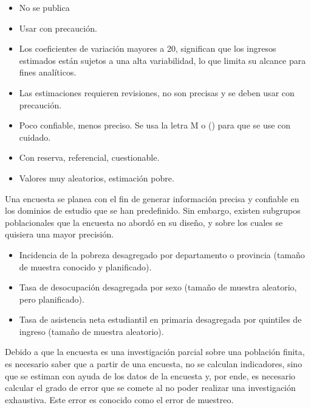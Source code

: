 \documentclass[12pt,spanish,]{book}
\providecommand{\tightlist}{%
  \setlength{\itemsep}{0pt}\setlength{\parskip}{0pt}}
\begin{document}
\begin{itemize}
\tightlist
\item
  No se publica
\item
  Usar con precaución.
\item
  Los coeficientes de variación mayores a 20, significan que los ingresos estimados están sujetos a una alta variabilidad, lo que limita su alcance para fines analíticos.
\item
  Las estimaciones requieren revisiones, no son precisas y se deben usar con precaución.
\item
  Poco confiable, menos preciso. Se usa la letra M o () para que se use con cuidado.
\item
  Con reserva, referencial, cuestionable.
\item
  Valores muy aleatorios, estimación pobre.
\end{itemize}

Una encuesta se planea con el fin de generar información precisa y confiable en los dominios de estudio que se han predefinido. Sin embargo, existen subgrupos poblacionales que la encuesta no abordó en su diseño, y sobre los cuales se quisiera una mayor precisión.

\begin{itemize}
\tightlist
\item
  Incidencia de la pobreza desagregado por departamento o provincia (tamaño de muestra conocido y planificado).
\item
  Tasa de desocupación desagregada por sexo (tamaño de muestra aleatorio, pero planificado).
\item
  Tasa de asistencia neta estudiantil en primaria desagregada por quintiles de ingreso (tamaño de muestra aleatorio).
\end{itemize}

Debido a que la encuesta es una investigación parcial sobre una población finita, es necesario saber que a partir de una encuesta, no se calculan indicadores, sino que se estiman con ayuda de los datos de la encuesta y, por ende, es necesario calcular el grado de error que se comete al no poder realizar una investigación exhaustiva. Este error es conocido como el error de muestreo.
\end{document}
